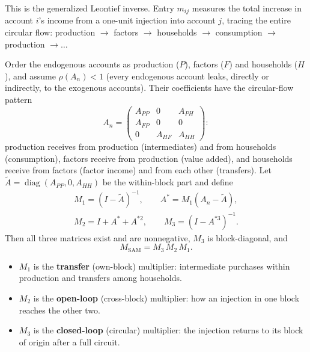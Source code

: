 \documentclass[../structural_economics_book.tex]{subfiles}
\begin{document}
This is the generalized Leontief inverse. Entry $m_{ij}$ measures the total increase in account $i$'s income from a one-unit injection into account $j$, tracing the entire circular flow: production $\to$ factors $\to$ households $\to$ consumption $\to$ production $\to \ldots$

\begin{proposition}\label{ch20:prop:decomposition}
Order the endogenous accounts as production ($P$), factors ($F$) and households ($H$), and assume $\rho(A_n) < 1$ (every endogenous account leaks, directly or indirectly, to the exogenous accounts). Their coefficients have the circular-flow pattern
\begin{equation}\label{ch20:eq:block_pattern}
A_n = \begin{pmatrix} A_{PP} & 0 & A_{PH} \\ A_{FP} & 0 & 0 \\ 0 & A_{HF} & A_{HH} \end{pmatrix}:
\end{equation}
production receives from production (intermediates) and from households (consumption), factors receive from production (value added), and households receive from factors (factor income) and from each other (transfers). Let $\tilde A = \operatorname{diag}(A_{PP}, 0, A_{HH})$ be the within-block part and define
\begin{gather*}
M_1 = (I - \tilde A)^{-1}, \qquad A^* = M_1 (A_n - \tilde A), \\
M_2 = I + A^* + A^{*2}, \qquad M_3 = (I - A^{*3})^{-1}.
\end{gather*}
Then all three matrices exist and are nonnegative, $M_3$ is block-diagonal, and \citep{pyatt1979accounting}
\begin{equation}\label{ch20:eq:pyatt_round}
M_{\text{SAM}} = M_3\, M_2\, M_1 .
\end{equation}
\begin{itemize}
\item $M_1$ is the \textbf{transfer} (own-block) multiplier: intermediate purchases within production and transfers among households.
\item $M_2$ is the \textbf{open-loop} (cross-block) multiplier: how an injection in one block reaches the other two.
\item $M_3$ is the \textbf{closed-loop} (circular) multiplier: the injection returns to its block of origin after a full circuit.
\end{itemize}
\end{proposition}
\end{document}
